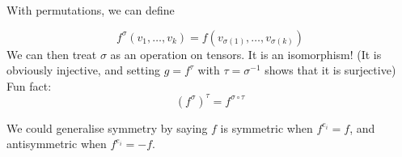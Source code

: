 \documentclass[12pt]{article}
\begin{document}
With permutations, we can define

$$f^\sigma(v_1,\dots,v_k) = f(v_{\sigma(1)}, \dots, v_{\sigma(k)})$$
We can then treat $\sigma$ as an operation on tensors. It is an isomorphism! (It is obviously injective, and setting $g = f^\tau$ with $\tau = \sigma^{-1}$ shows that it is surjective) \\
Fun fact:
$$(f^\sigma)^\tau = f^{\sigma \circ \tau}$$

We could generalise symmetry by saying $f$ is symmetric when $f^{e_i} = f$, and antisymmetric when $f^{e_i} = -f$.
\end{document}
